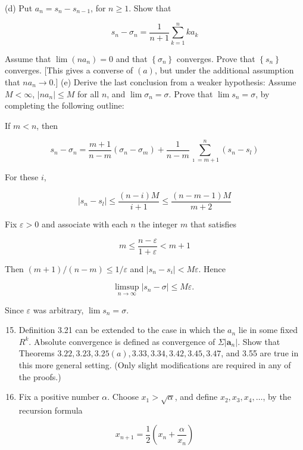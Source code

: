 \documentclass[10pt]{article}
\begin{document}
(d) Put $a_{n}=s_{n}-s_{n-1}$, for $n \geq 1$. Show that

$$
s_{n}-\sigma_{n}=\frac{1}{n+1} \sum_{k=1}^{n} k a_{k}
$$

Assume that $\lim \left(n a_{n}\right)=0$ and that $\left\{\sigma_{n}\right\}$ converges. Prove that $\left\{s_{n}\right\}$ converges. [This gives a converse of $(a)$, but under the additional assumption that $n a_{n} \rightarrow 0$.] (e) Derive the last conclusion from a weaker hypothesis: Assume $M<\infty$, $\left|n a_{n}\right| \leq M$ for all $n$, and $\lim \sigma_{n}=\sigma$. Prove that $\lim s_{n}=\sigma$, by completing the following outline:

If $m<n$, then

$$
s_{n}-\sigma_{n}=\frac{m+1}{n-m}\left(\sigma_{n}-\sigma_{m}\right)+\frac{1}{n-m} \sum_{\imath=m+1}^{n}\left(s_{n}-s_{l}\right)
$$

For these $i$,

$$
\left|s_{n}-s_{l}\right| \leq \frac{(n-i) M}{i+1} \leq \frac{(n-m-1) M}{m+2}
$$

Fix $\varepsilon>0$ and associate with each $n$ the integer $m$ that satisfies

$$
m \leq \frac{n-\varepsilon}{1+\varepsilon}<m+1
$$

Then $(m+1) /(n-m) \leq 1 / \varepsilon$ and $\left|s_{n}-s_{i}\right|<M \varepsilon$. Hence

$$
\limsup _{n \rightarrow \infty}\left|s_{n}-\sigma\right| \leq M \varepsilon \text {. }
$$

Since $\varepsilon$ was arbitrary, $\lim s_{n}=\sigma$.

\begin{enumerate}
  \setcounter{enumi}{14}
  \item Definition 3.21 can be extended to the case in which the $a_{n}$ lie in some fixed $R^{k}$. Absolute convergence is defined as convergence of $\Sigma\left|\mathbf{a}_{n}\right|$. Show that Theorems $3.22,3.23,3.25(a), 3.33,3.34,3.42,3.45,3.47$, and 3.55 are true in this more general setting. (Only slight modifications are required in any of the proofs.)

  \item Fix a positive number $\alpha$. Choose $x_{1}>\sqrt{\alpha}$, and define $x_{2}, x_{3}, x_{4}, \ldots$, by the recursion formula

\end{enumerate}

$$
x_{n+1}=\frac{1}{2}\left(x_{n}+\frac{\alpha}{x_{n}}\right)
$$
\end{document}
